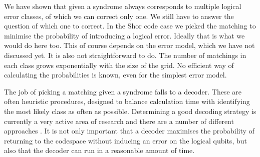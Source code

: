 We have shown that given a syndrome always corresponds to multiple logical error classes, of which we can correct only one. We still have to answer the question of which one to correct. In the Shor code case we picked the matching to minimise the probability of introducing a logical error. Ideally that is what we would do here too. This of course depends on the error model, which we have not discussed yet. It is also not straightforward to do. The number of matchings in each class grows exponentially with the size of the grid. No efficient way of calculating the probabilities is known, even for the simplest error model.

The job of picking a matching given a syndrome falls to a decoder. These are often heuristic procedures, designed to balance calculation time with identifying the most likely class as often as possible. Determining a good decoding strategy is currently a very active area of research and there are a number of different approaches \cite{poulin_renormalisation, fowler_classical_processing, wooton_mcmc1}. It is not only important that a decoder maximises the probability of returning to the codespace without inducing an error on the logical qubits, but also that the decoder can run in a reasonable amount of time. 





